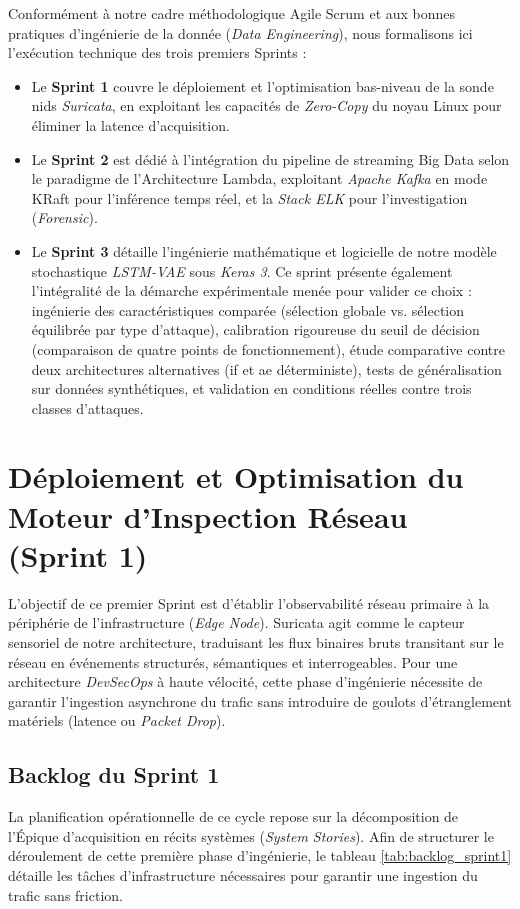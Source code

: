 Conformément à notre cadre méthodologique Agile Scrum et aux bonnes pratiques d'ingénierie de la donnée (\textit{Data Engineering}), nous formalisons ici l'exécution technique des trois premiers Sprints :
\begin{itemize}
    \item Le \textbf{Sprint 1} couvre le déploiement et l'optimisation bas-niveau de la sonde \acrshort{nids} \textit{Suricata}, en exploitant les capacités de \textit{Zero-Copy} du noyau Linux pour éliminer la latence d'acquisition.
    \item Le \textbf{Sprint 2} est dédié à l'intégration du pipeline de streaming Big Data selon le paradigme de l'Architecture Lambda, exploitant \textit{Apache Kafka} en mode KRaft pour l'inférence temps réel, et la \textit{Stack ELK} pour l'investigation (\textit{Forensic}).
    \item Le \textbf{Sprint 3} détaille l'ingénierie mathématique et logicielle de notre modèle stochastique \textit{LSTM-VAE} sous \textit{Keras 3}. Ce sprint présente également l'intégralité de la démarche expérimentale menée pour valider ce choix : ingénierie des caractéristiques comparée (sélection globale vs. sélection équilibrée par type d'attaque), calibration rigoureuse du seuil de décision (comparaison de quatre points de fonctionnement), étude comparative contre deux architectures alternatives (\acrshort{if} et \acrshort{ae} déterministe), tests de généralisation sur données synthétiques, et validation en conditions réelles contre trois classes d'attaques.
\end{itemize}

\section{Déploiement et Optimisation du Moteur d'Inspection Réseau (Sprint 1)}

L'objectif de ce premier Sprint est d'établir l'observabilité réseau primaire à la périphérie de l'infrastructure (\textit{Edge Node}). Suricata agit comme le capteur sensoriel de notre architecture, traduisant les flux binaires bruts transitant sur le réseau en événements structurés, sémantiques et interrogeables. Pour une architecture \textit{DevSecOps} à haute vélocité, cette phase d'ingénierie nécessite de garantir l'ingestion asynchrone du trafic sans introduire de goulots d'étranglement matériels (latence ou \textit{Packet Drop}).

\subsection{Backlog du Sprint 1}
La planification opérationnelle de ce cycle repose sur la décomposition de l'Épique d'acquisition en récits systèmes (\textit{System Stories}). Afin de structurer le déroulement de cette première phase d'ingénierie, le tableau \ref{tab:backlog_sprint1} détaille les tâches d'infrastructure nécessaires pour garantir une ingestion du trafic sans friction.


